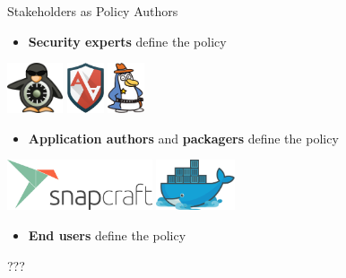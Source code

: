 \documentclass[12pt, dvipsnames]{beamer}
\begin{document}
\begin{frame}[t]{Stakeholders as Policy Authors}
\begin{itemize}
    \item \textbf{Security experts} define the policy
\end{itemize}
\begin{center}
    \includegraphics[height=4em]{figs/selinux.png}
    \hspace{3em}
    \includegraphics[height=4em]{figs/apparmor.png}
    \hspace{3em}
    \includegraphics[height=4em]{figs/tomoyo.png}
\end{center}

\begin{itemize}
    \item \textbf{Application authors} and \textbf{packagers} define the policy
\end{itemize}
\begin{center}
    \includegraphics[height=4em]{figs/snapcraft.png}
    \hspace{3em}
    \includegraphics[height=4em]{figs/docker.png}
\end{center}

\begin{itemize}
    \item \textbf{End users} define the policy
\end{itemize}
\begin{center}
    \Huge ???
\end{center}
\end{frame}
\end{document}
